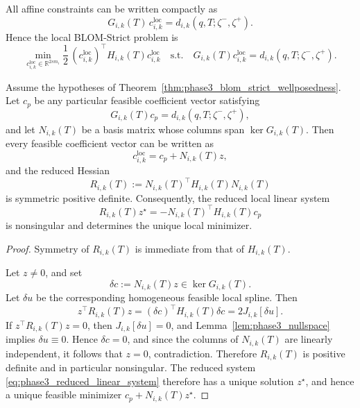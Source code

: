 All affine constraints can be written compactly as
\begin{equation}
\label{eq:phase3_local_constraints_matrix}
G_{i,k}(T)\,c_{i,k}^{\mathrm{loc}}
=
d_{i,k}(q,T;\zeta^-,\zeta^+).
\end{equation}
Hence the local BLOM-Strict problem is
\begin{equation}
\label{eq:phase3_local_qp}
\boxed{
\min_{c_{i,k}^{\mathrm{loc}}\in\mathbb R^{2s m_i}}
\frac{1}{2}\,(c_{i,k}^{\mathrm{loc}})^\top H_{i,k}(T)c_{i,k}^{\mathrm{loc}}
\quad\text{s.t.}\quad
G_{i,k}(T)c_{i,k}^{\mathrm{loc}}
=
d_{i,k}(q,T;\zeta^-,\zeta^+).
}
\end{equation}

\begin{proposition}
\label{prop:phase3_reduced_system}
Assume the hypotheses of Theorem~\ref{thm:phase3_blom_strict_wellposedness}.
Let \(c_p\) be any particular feasible coefficient vector satisfying
\[
G_{i,k}(T)c_p=d_{i,k}(q,T;\zeta^-,\zeta^+),
\]
and let \(N_{i,k}(T)\) be a basis matrix whose columns span \(\ker G_{i,k}(T)\).
Then every feasible coefficient vector can be written as
\[
c_{i,k}^{\mathrm{loc}}=c_p+N_{i,k}(T)z,
\]
and the reduced Hessian
\begin{equation}
\label{eq:phase3_reduced_hessian}
R_{i,k}(T):=
N_{i,k}(T)^\top H_{i,k}(T)N_{i,k}(T)
\end{equation}
is symmetric positive definite.
Consequently, the reduced local linear system
\begin{equation}
\label{eq:phase3_reduced_linear_system}
R_{i,k}(T)z^\star
=
-
N_{i,k}(T)^\top H_{i,k}(T)c_p
\end{equation}
is nonsingular and determines the unique local minimizer.
\end{proposition}

\begin{proof}
Symmetry of \(R_{i,k}(T)\) is immediate from that of \(H_{i,k}(T)\).

Let \(z\neq 0\), and set
\[
\delta c:=N_{i,k}(T)z\in \ker G_{i,k}(T).
\]
Let \(\delta u\) be the corresponding homogeneous feasible local spline.
Then
\[
z^\top R_{i,k}(T)z
=
(\delta c)^\top H_{i,k}(T)\delta c
=
2J_{i,k}[\delta u].
\]
If \(z^\top R_{i,k}(T)z=0\), then \(J_{i,k}[\delta u]=0\), and Lemma~\ref{lem:phase3_nullspace} implies \(\delta u\equiv 0\).
Hence \(\delta c=0\), and since the columns of \(N_{i,k}(T)\) are linearly independent, it follows that \(z=0\), contradiction.
Therefore \(R_{i,k}(T)\) is positive definite and in particular nonsingular.
The reduced system \eqref{eq:phase3_reduced_linear_system} therefore has a unique solution \(z^\star\), and hence a unique feasible minimizer \(c_p+N_{i,k}(T)z^\star\).
\end{proof}

